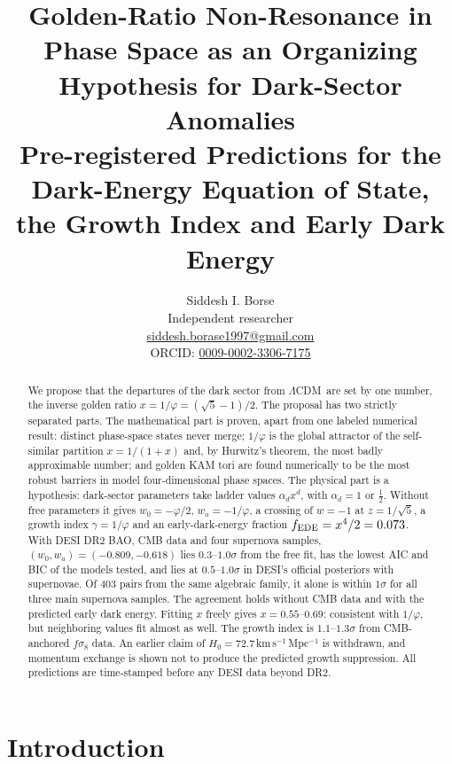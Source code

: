 \documentclass[11pt]{article}
\title{\textbf{Golden-Ratio Non-Resonance in Phase Space as an Organizing Hypothesis for Dark-Sector Anomalies}\\[6pt]
\large Pre-registered Predictions for the Dark-Energy Equation of State, the Growth Index and Early Dark Energy}
\author{Siddesh I. Borse\\[2pt] {\small Independent researcher}\\ {\small \href{mailto:siddesh.borase1997@gmail.com}{siddesh.borase1997@gmail.com}}\\ {\small ORCID: \href{https://orcid.org/0009-0002-3306-7175}{0009-0002-3306-7175}}}
\date{\lockdate}
\theoremstyle{definition}
\theoremstyle{remark}
\newcommand{\gr}{\varphi}
\newcommand{\LCDM}{$\Lambda$CDM}
\newcommand{\fede}{f_{\rm EDE}}
\begin{document}
\maketitle

\begin{abstract}
We propose that the departures of the dark sector from \LCDM\ are set by one number, the inverse golden ratio $x = 1/\gr = (\sqrt5-1)/2$. The proposal has two strictly separated parts. The mathematical part is proven, apart from one labeled numerical result: distinct phase-space states never merge; $1/\gr$ is the global attractor of the self-similar partition $x = 1/(1+x)$ and, by Hurwitz's theorem, the most badly approximable number; and golden KAM tori are found numerically to be the most robust barriers in model four-dimensional phase spaces. The physical part is a hypothesis: dark-sector parameters take ladder values $\alpha_d x^d$, with $\alpha_d = 1$ or $\tfrac12$. Without free parameters it gives $w_0 = -\gr/2$, $w_a = -1/\gr$, a crossing of $w = -1$ at $z = 1/\sqrt5$, a growth index $\gamma = 1/\gr$ and an early-dark-energy fraction $\fede = x^4/2 = 0.073$. With DESI DR2 BAO, CMB data and four supernova samples, $(w_0, w_a) = (-0.809, -0.618)$ lies $0.3$--$1.0\sigma$ from the free fit, has the lowest AIC and BIC of the models tested, and lies at $0.5$--$1.0\sigma$ in DESI's official posteriors with supernovae. Of 403 pairs from the same algebraic family, it alone is within $1\sigma$ for all three main supernova samples. The agreement holds without CMB data and with the predicted early dark energy. Fitting $x$ freely gives $x = 0.55$--$0.69$: consistent with $1/\gr$, but neighboring values fit almost as well. The growth index is $1.1$--$1.3\sigma$ from CMB-anchored $f\sigma_8$ data. An earlier claim of $H_0 = 72.7$\,km\,s$^{-1}$\,Mpc$^{-1}$ is withdrawn, and momentum exchange is shown not to produce the predicted growth suppression. All predictions are time-stamped before any DESI data beyond DR2.
\end{abstract}

\section{Introduction}
\end{document}
